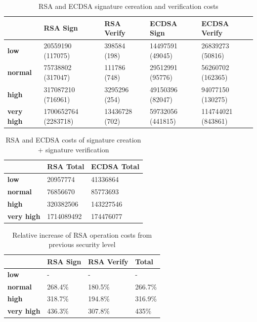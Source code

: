 \documentclass{llncs}
\begin{document}
\begin{table}[]
  \begin{tabular}{|l|l|l|l|l|}
  \hline
                    & \textbf{RSA Sign}    & \textbf{RSA Verify} & \textbf{ECDSA Sign} & \textbf{ECDSA Verify} \\ \hline
  \textbf{low}       & 20559190 (117075)    & 398584 (198)        & 14497591 (49045)    & 26839273 (50816)      \\ \hline
  \textbf{normal}    & 75738802 (317047)    & 111786 (748)       & 29512991 (95776)    & 56260702 (162365)     \\ \hline
  \textbf{high}      & 317087210 (716961)   & 3295296 (254)       & 49150396 (82047)     & 94077150 (130275)     \\ \hline
  \textbf{very high} & 1700652764 (2283718) & 13436728 (702)      & 59732056 (441815)   & 114744021 (843861)    \\ \hline
  \end{tabular}
  \caption{\label{table:rsa-costs-all-sls} RSA and ECDSA signature cereation and verification costs} \end{table}

\begin{table}[]
  \begin{tabular}{|l|l|l|}
                     & \textbf{RSA Total} & \textbf{ECDSA Total} \\ \hline
  \textbf{low}       & 20957774           & 41336864             \\ \hline
  \textbf{normal}    & 76856670           & 85773693             \\ \hline
  \textbf{high}      & 320382506          & 143227546            \\ \hline
  \textbf{very high} & 1714089492         & 174476077           
  \end{tabular}
  \caption{\label{table:rsa-costs-all-sls-total} RSA and ECDSA costs of signature creation + signature verification}
\end{table}

\begin{table}[]
\begin{tabular}{|l|l|l|l|}
                   & \textbf{RSA Sign} & \textbf{RSA Verify} & \textbf{Total} \\ \hline
\textbf{low}       & -                 & -                   & -              \\ \hline
\textbf{normal}    & 268.4\%           & 180.5\%             & 266.7\%        \\ \hline
\textbf{high}      & 318.7\%           & 194.8\%             & 316.9\%        \\ \hline
\textbf{very high} & 436.3\%           & 307.8\%             & 435\%          \\ \hline
\end{tabular}
\caption{\label{table:rsa-pub-priv-cost-increasee} Relative increase of RSA operation costs from previous security level}
\end{table}
\end{document}
